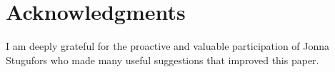 \documentclass{acm_proc_article-sp}
\begin{document}
\section{Acknowledgments}
I am deeply grateful for the proactive and valuable participation of Jonna Stugufors who made many useful suggestions that improved this paper.



\end{document}
